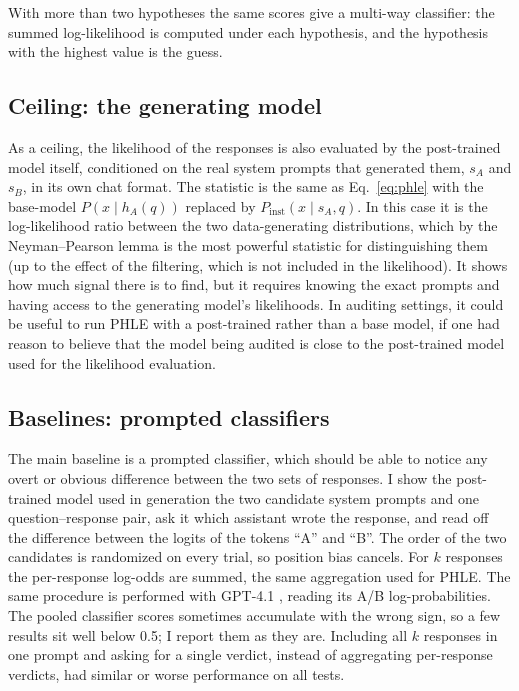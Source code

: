 \documentclass{article}
\newcommand{\phle}{PHLE\xspace}
\begin{document}
With more than two hypotheses the same scores give a multi-way classifier: the summed log-likelihood is computed under each hypothesis, and the hypothesis with the highest value is the guess.

\subsection{Ceiling: the generating model}

As a ceiling, the likelihood of the responses is also evaluated by the post-trained model itself, conditioned on the real system prompts that generated them, $s_A$ and $s_B$, in its own chat format.
The statistic is the same as Eq.~\eqref{eq:phle} with the base-model $P(x \mid h_A(q))$ replaced by $P_{\text{inst}}(x \mid s_A, q)$.
In this case it is the log-likelihood ratio between the two data-generating distributions, which by the Neyman--Pearson lemma \citep{neyman1933} is the most powerful statistic for distinguishing them (up to the effect of the filtering, which is not included in the likelihood).
It shows how much signal there is to find, but it requires knowing the exact prompts and having access to the generating model's likelihoods.
In auditing settings, it could be useful to run \phle with a post-trained rather than a base model, if one had reason to believe that the model being audited is close to the post-trained model used for the likelihood evaluation.

\subsection{Baselines: prompted classifiers}

The main baseline is a prompted classifier, which should be able to notice any overt or obvious difference between the two sets of responses.
I show the post-trained model used in generation the two candidate system prompts and one question--response pair, ask it which assistant wrote the response, and read off the difference between the logits of the tokens ``A'' and ``B''.
The order of the two candidates is randomized on every trial, so position bias cancels.
For $k$ responses the per-response log-odds are summed, the same aggregation used for \phle.
The same procedure is performed with GPT-4.1 \citep{openai2025gpt41}, reading its A/B log-probabilities.
The pooled classifier scores sometimes accumulate with the wrong sign, so a few results sit well below 0.5; I report them as they are.
Including all $k$ responses in one prompt and asking for a single verdict, instead of aggregating per-response verdicts, had similar or worse performance on all tests.
\end{document}
